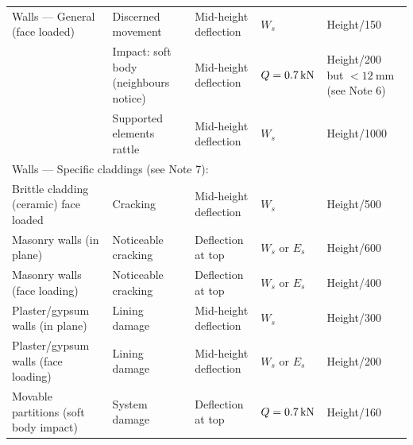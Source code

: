 \begin{table}
\begin{tabular}{lllll}
	Walls --- General (face loaded)                                  & Discerned movement                    & Mid-height deflection             & $W_s$                       & Height/150                                    \\
	                                                                 & Impact: soft body (neighbours notice) & Mid-height deflection             & $Q=\SI{0.7}{\kilo\newton}$           & Height/200 but $<\SI{12}{\mm}$ (see Note 6)   \\
	                                                                 & Supported elements rattle             & Mid-height deflection             & $W_s$                       & Height/1000                                   \\
	\multicolumn{5}{l}{Walls --- Specific claddings (see Note 7): }                                                                                                                                                            \\
	Brittle cladding (ceramic) face loaded                           & Cracking                              & Mid-height deflection             & $W_s$                       & Height/500                                    \\
	Masonry walls (in plane)                                         & Noticeable cracking                   & Deflection at top                 & $W_s$ or $E_s$              & Height/600                                    \\
	Masonry walls (face loading)                                     & Noticeable cracking                   & Deflection at top                 & $W_s$ or $E_s$              & Height/400                                    \\
	Plaster/gypsum walls (in plane)                                  & Lining damage                         & Mid-height deflection             & $W_s$                       & Height/300                                    \\
	Plaster/gypsum walls (face loading)                              & Lining damage                         & Mid-height deflection             & $W_s$ or $E_s$              & Height/200                                    \\
	Movable partitions (soft body impact)                            & System damage                         & Deflection at top                 & $Q=\SI{0.7}{\kilo\newton}$           & Height/160                                    \\

\end{tabular}
\end{table}
